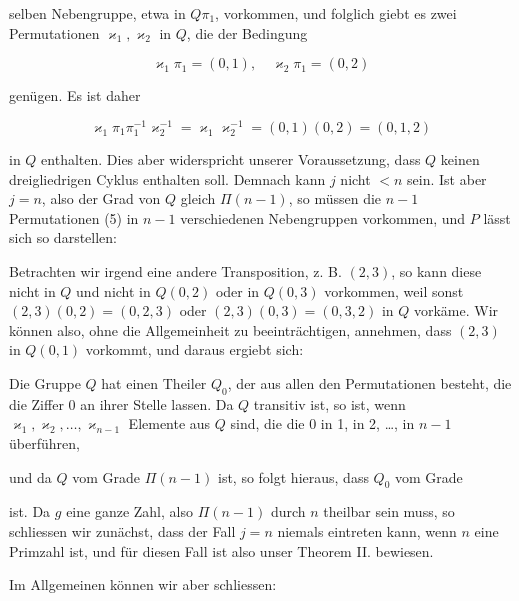 selben Nebengruppe, etwa in $Q\pi_1$, vorkommen, und folglich giebt es zwei
Permutationen $\varkappa_1, \varkappa_2$ in $Q$, die der Bedingung

\[ \varkappa_1 \pi_1 = (0, 1), \quad \varkappa_2 \pi_1 = (0, 2) \]

genügen. Es ist daher

\[ \varkappa_1 \pi_1 \pi_1^{-1} \varkappa_2^{-1} = \varkappa_1 \varkappa_2^{-1} = (0,1)(0,2) = (0,1,2) \]

in $Q$ enthalten. Dies aber widerspricht unserer Voraussetzung, dass $Q$ keinen
dreigliedrigen Cyklus enthalten soll. Demnach kann $j$ nicht $< n$ sein. Ist aber
$j = n$, also der Grad von $Q$ gleich $\Pi(n-1)$, so müssen die $n-1$ Permutationen
(5) in $n-1$ verschiedenen Nebengruppen vorkommen, und $P$ lässt sich so darstellen:


Betrachten wir irgend eine andere Transposition, z. B. $(2,3)$, so kann diese
nicht in $Q$ und nicht in $Q(0,2)$ oder in $Q(0,3)$ vorkommen, weil sonst
$(2,3)(0,2) = (0,2,3)$ oder $(2,3)(0,3) = (0,3,2)$ in $Q$ vorkäme. Wir können also,
ohne die Allgemeinheit zu beeinträchtigen, annehmen, dass $(2,3)$ in $Q(0,1)$
vorkommt, und daraus ergiebt sich:



Die Gruppe $Q$ hat einen Theiler $Q_0$, der aus allen den Permutationen besteht,
die die Ziffer 0 an ihrer Stelle lassen. Da $Q$ transitiv ist, so ist, wenn
$\varkappa_1, \varkappa_2, \ldots, \varkappa_{n-1}$ Elemente aus $Q$ sind, die die 0
in 1, in 2, \ldots, in $n-1$ überführen,


und da $Q$ vom Grade $\Pi(n-1)$ ist, so folgt hieraus, dass $Q_0$ vom Grade


ist. Da $g$ eine ganze Zahl, also $\Pi(n-1)$ durch $n$ theilbar sein muss, so
schliessen wir zunächst, dass der Fall $j = n$ niemals eintreten kann, wenn $n$
eine Primzahl ist, und für diesen Fall ist also unser Theorem II. bewiesen.

Im Allgemeinen können wir aber schliessen:

